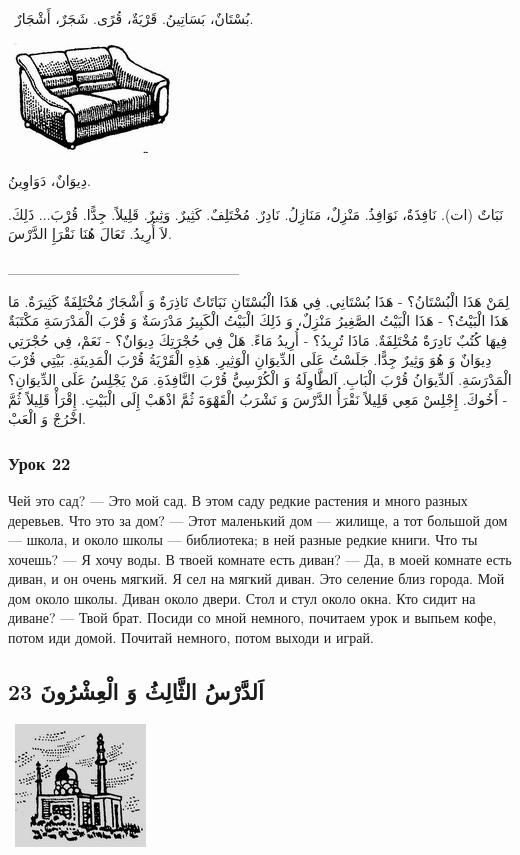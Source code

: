 \documentclass[a5paper]{article}
\begin{document}
\ بُسْتَانٌ، بَسَاتِينُ. قَرْيَةٌ، قُرًى. شَجَرٌ، أَشْجَارٌ. 

 \includegraphics[width=1.75in,height=1.1457in]{MuhammadBagauddinlatinized-img039.jpg}  

دِيوَانٌ، دَوَاوِينُ. 

نَبَاتٌ (ات). نَافِذَةٌ، نَوَافِذُ. مَنْزِلٌ، مَنَازِلُ. نَادِرٌ. مُخْتَلِفٌ. كَثِيرٌ. وَثِيرٌ. قَلِيلاً. جِدًّا. قُرْبَ... ذَلِكَ. لاَ أُرِيدُ. تَعَالَ هُنَا نَقْرَإِ الدَّرْسَ.

\_\_\_\_\_\_\_\_\_\_\_\_\_\_\_\_\_\_\_\_\_\_

لِمَنْ هَذَا الْبُسْتَانُ؟ - هَذَا بُسْتَانِي. فِي هَذَا الْبُسْتَانِ نَبَاتَاتٌ نَاذِرَةٌ وَ أَشْجَارٌ مُخْتَلِفَةٌ كَثِيرَةٌ. مَا هَذَا الْبَيْتُ؟ - هَذَا الْبَيْتُ الصَّغِيرُ مَنْزِلٌ، وَ ذَلِكَ الْبَيْتُ الْكَبِيرُ مَدْرَسَةٌ وَ قُرْبَ الْمَدْرَسَةِ مَكْتَبَةٌ فِيهَا كُتُبٌ نَادِرَةٌ مُخْتَلِفَةٌ. مَاذَا تُرِيدُ؟ - أُرِيدُ مَاءً. هَلْ فِي حُجْرَتِكَ دِيوَانٌ؟ - نَعَمْ، فِي حُجْرَتِي دِيوَانٌ وَ هُوَ وَثِيرٌ جِدًّا. جَلَسْتُ عَلَى الدِّيوَانِ الْوَثِيرِ. هَذِهِ الْقَرْيَةُ قُرْبَ الْمَدِينَةِ. بَيْتِي قُرْبَ الْمَدْرَسَةِ. اَلدِّيوَانُ قُرْبَ الْبَابِ. اَلطَّاوِلَةُ وَ الْكُرْسِيُّ قُرْبَ النَّافِذَةِ. مَنْ يَجْلِسُ عَلَى الدِّيوَانِ؟ - أَخُوكَ. إِجْلِسْ مَعِي قَلِيلاً نَقْرَأُ الدَّرْسَ وَ نَشْرَبُ الْقَهْوَةَ ثُمَّ اذْهَبْ إِلَى الْبَيْتِ. إِقْرَأْ قَلِيلاً ثُمَّ اخْرُجْ وَ الْعَبْ.

\subsubsection{Урок 22}
Чей это сад? — Это мой сад. В этом саду редкие растения и много разных деревьев. Что это за дом? — Этот маленький дом — жилище, а тот большой дом — школа, и около школы — библиотека; в ней разные редкие книги. Что ты хочешь? — Я хочу воды. В твоей комнате есть диван? — Да, в моей комнате есть диван, и он очень мягкий. Я сел на мягкий диван. Это селение близ города. Мой дом около школы. Диван около двери. Стол и стул около окна. Кто сидит на диване? — Твой брат. Посиди со мной немного, почитаем урок и выпьем кофе, потом иди домой. Почитай немного, потом выходи и играй.

\subsection{23 اَلدَّرْسُ الثَّالِثُ وَ الْعِشْرُونَ}
\  \includegraphics[width=1.3646in,height=1.2811in]{MuhammadBagauddinlatinized-img040.jpg} 
\end{document}
